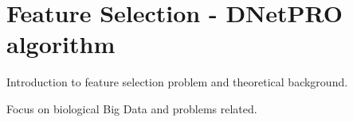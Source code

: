 \documentclass{standalone}
\begin{document}
\chapter[Feature Selection]{Feature Selection - DNetPRO algorithm}\label{featsel}

Introduction to feature selection problem and theoretical background.

Focus on biological Big Data and problems related.
\end{document}
